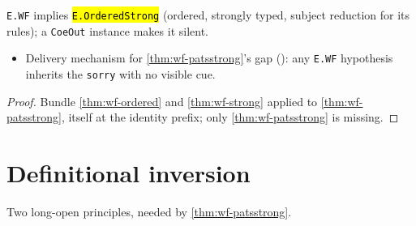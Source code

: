\begin{theorem}
\label{thm:wf-orderedstrong}
\leanok
{}

 \texttt{E.WF} implies \hl{\texttt{E.OrderedStrong}} (ordered, strongly
typed, subject reduction for its rules); a \texttt{CoeOut} instance makes it silent.
\begin{itemize}
\item {} Delivery mechanism for \ref{thm:wf-patsstrong}'s gap
  (): any \texttt{E.WF} hypothesis
  inherits the \texttt{sorry} with no visible cue.
\end{itemize}
\end{theorem}
\begin{proof}
\leanok
{} Bundle \ref{thm:wf-ordered} and \ref{thm:wf-strong} applied to
\ref{thm:wf-patsstrong}, itself at the identity prefix; only \ref{thm:wf-patsstrong} is
missing.
\end{proof}

\section{Definitional inversion}

Two long-open principles, needed by \ref{thm:wf-patsstrong}.

